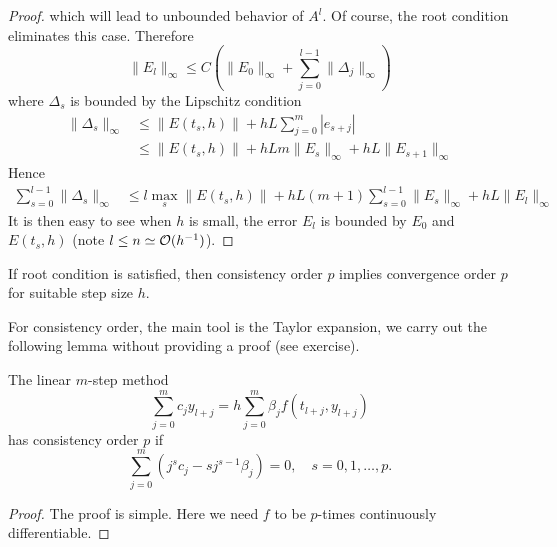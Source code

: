 \begin{proof}
    which will lead to unbounded behavior of $A^l$. Of course, the root condition eliminates this case. Therefore 
    \begin{equation}
        \|E_{l}\|_{\infty} \le C \left( \|E_0\|_{\infty} + \sum_{j=0}^{l-1} \|\Delta_j\|_{\infty}\right) 
    \end{equation}
    where $\Delta_s$ is bounded by the Lipschitz condition 
    \begin{equation}
        \begin{aligned}
            \|\Delta_s\|_{\infty} & \le \|E(t_s, h)\| + h L \sum_{j=0}^m |e_{s+j}| \\
            & \le        \|E(t_s, h)\| + h L m \|E_s\|_{\infty} + hL \|E_{s+1}\|_{\infty}
        \end{aligned}
    \end{equation}
    Hence 
    \begin{equation}
        \begin{aligned}
           \sum_{s = 0}^{l-1} \|\Delta_s\|_{\infty} & \le l\max_{s}\|E(t_s, h)\| + h L (m +1) \sum_{s=0}^{l-1}\|E_s\|_{\infty} + hL \|E_{l}\|_{\infty}  
        \end{aligned}
    \end{equation}
    It is then easy to see when $h$ is small, the error $E_l$ is bounded by $E_0$ and $E(t_s, h)$ (note $l\le n\simeq \mathcal O(h^{-1})$). 
\end{proof}
\begin{corollary}
    If root condition is satisfied, then consistency order $p$ implies convergence order $p$ for suitable step size $h$.
\end{corollary} 
For consistency order, the main tool is the Taylor expansion, we carry out the following lemma without providing a proof (see exercise). 
\begin{lemma}\label{Lem: 6-CONSISTENCY}
    The linear $m$-step method 
    \begin{equation}
        \sum_{j=0}^m c_j y_{l+j} = h \sum_{j=0}^m \beta_j f(t_{l + j}, y_{l+j})
    \end{equation}
    has consistency order $p$ if 
    \begin{equation}
        \sum_{j=0}^m (j^s c_j - s j^{s-1}\beta_j) = 0,\quad s = 0,1,\dots, p.
    \end{equation}
\end{lemma}
\begin{proof}
    The proof is simple. Here we need $f$ to be $p$-times continuously differentiable.
\end{proof}

